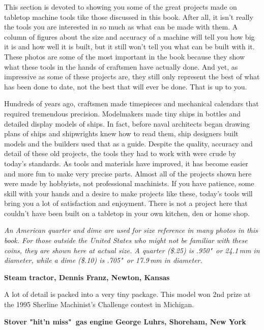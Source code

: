 
This section is devoted to showing you some of the great projects made on
tabletop machine tools tike those discussed in this book. After all, it isn't
really the tools you are interested in so much as what can be made with them. A
column of figures about the size and accuracy of a machine will tell you how big
it is and how well it is built, but it still won't tell you what can be built
with it. These photos are some of the most important in the book because they
show what these tools in the hands of craftsmen have actually done. And yet, as
impressive as some of these projects are, they still only represent the best of
what has been done to date, not the best that will ever be done. That is up to
you.

Hundreds of years ago, craftsmen made timepieces and mechanical calendars that
required tremendous precision. Modelmakers made tiny ships in bottles and
detailed display models of ships. In fact, before naval architects began drawing
plans of ships and shipwrights knew how to read them, ship designers built
models and the builders used that as a guide. Despite the quality, accuracy and
detail of these old projects, the tools they had to work with were crude by
today's standards. As tools and materials have improved, it has become easier
and more fun to make very precise parts. Almost all of the projects shown here
were made by hobbyists, not professional machinists. If you have patience, some
skill with your hands and a desire to make projects like these, today's tools
will bring you a lot of satisfaction and enjoyment. There is not a project here
that couldn't have been built on a tabletop in your own kitchen, den or home
shop.

\bigskip
\textit{An American quarter and dime are used for size reference in many photos
in this book. For those outside the United States who might not be familiar with
these coins, they are shown here at actual size. A quarter (\$.25) is .950"\ or
24.1\,mm in diameter, while a dime (\$.10) is .705"\ or 17.9\,mm in diameter.}
\bigskip

\bigskip
\textbf{Steam tractor, Dennis Franz, Newton, Kansas}

A lot of detail is packed into a very tiny package. This model won 2nd prize at
the 1995 Sherline Machinist's Challenge contest in Michigan.

\bigskip
\textbf{Stover "hit'n miss"\ gas engine George Luhrs, Shoreham, New York}

